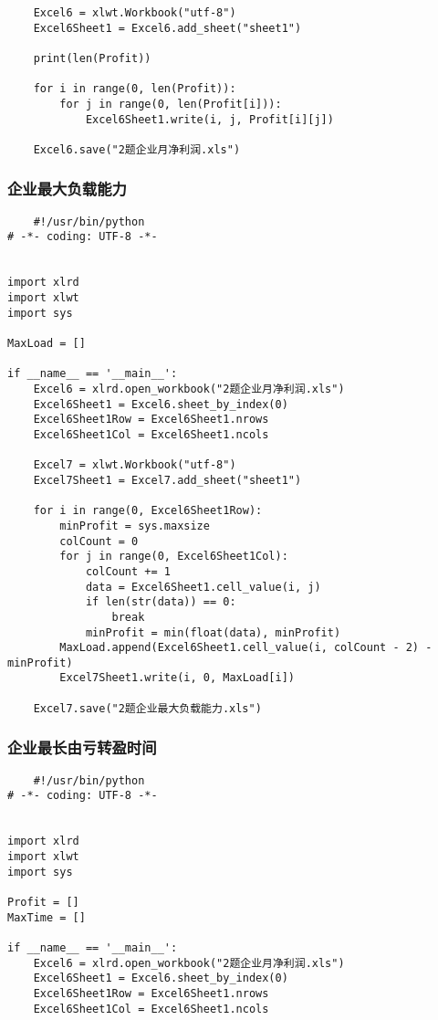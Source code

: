 \documentclass[dvipsnames,withoutpreface,bwprint]{cumcmthesis}
\begin{document}
\begin{appendices}
\begin{lstlisting}
    Excel6 = xlwt.Workbook("utf-8")
    Excel6Sheet1 = Excel6.add_sheet("sheet1")

    print(len(Profit))

    for i in range(0, len(Profit)):
        for j in range(0, len(Profit[i])):
            Excel6Sheet1.write(i, j, Profit[i][j])

    Excel6.save("2题企业月净利润.xls")
\end{lstlisting}
\subsubsection{企业最大负载能力}
\begin{lstlisting}
    #!/usr/bin/python
# -*- coding: UTF-8 -*-


import xlrd
import xlwt
import sys

MaxLoad = []

if __name__ == '__main__':
    Excel6 = xlrd.open_workbook("2题企业月净利润.xls")
    Excel6Sheet1 = Excel6.sheet_by_index(0)
    Excel6Sheet1Row = Excel6Sheet1.nrows
    Excel6Sheet1Col = Excel6Sheet1.ncols

    Excel7 = xlwt.Workbook("utf-8")
    Excel7Sheet1 = Excel7.add_sheet("sheet1")

    for i in range(0, Excel6Sheet1Row):
        minProfit = sys.maxsize
        colCount = 0
        for j in range(0, Excel6Sheet1Col):
            colCount += 1
            data = Excel6Sheet1.cell_value(i, j)
            if len(str(data)) == 0:
                break
            minProfit = min(float(data), minProfit)
        MaxLoad.append(Excel6Sheet1.cell_value(i, colCount - 2) - minProfit)
        Excel7Sheet1.write(i, 0, MaxLoad[i])

    Excel7.save("2题企业最大负载能力.xls")
\end{lstlisting}
\subsubsection{企业最长由亏转盈时间}
\begin{lstlisting}
    #!/usr/bin/python
# -*- coding: UTF-8 -*-


import xlrd
import xlwt
import sys

Profit = []
MaxTime = []

if __name__ == '__main__':
    Excel6 = xlrd.open_workbook("2题企业月净利润.xls")
    Excel6Sheet1 = Excel6.sheet_by_index(0)
    Excel6Sheet1Row = Excel6Sheet1.nrows
    Excel6Sheet1Col = Excel6Sheet1.ncols


\end{lstlisting}
\end{appendices}
\end{document}
